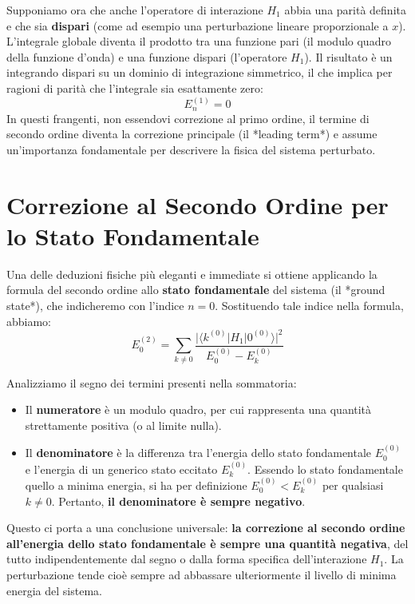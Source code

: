 Supponiamo ora che anche l'operatore di interazione $H_1$ abbia una parità definita e che sia \textbf{dispari} (come ad esempio una perturbazione lineare proporzionale a $x$). L'integrale globale diventa il prodotto tra una funzione pari (il modulo quadro della funzione d'onda) e una funzione dispari (l'operatore $H_1$). Il risultato è un integrando dispari su un dominio di integrazione simmetrico, il che implica per ragioni di parità che l'integrale sia esattamente zero:
\begin{equation}
E_n^{(1)} = 0
\end{equation}
In questi frangenti, non essendovi correzione al primo ordine, il termine di secondo ordine diventa la correzione principale (il *leading term*) e assume un'importanza fondamentale per descrivere la fisica del sistema perturbato.

\section{Correzione al Secondo Ordine per lo Stato Fondamentale}

Una delle deduzioni fisiche più eleganti e immediate si ottiene applicando la formula del secondo ordine allo \textbf{stato fondamentale} del sistema (il *ground state*), che indicheremo con l'indice $n=0$. Sostituendo tale indice nella formula, abbiamo:
\begin{equation}
E_0^{(2)} = \sum_{k \neq 0} \frac{\big| \langle k^{(0)} | H_1 | 0^{(0)} \rangle \big|^2}{E_0^{(0)} - E_k^{(0)}}
\end{equation}

Analizziamo il segno dei termini presenti nella sommatoria:
\begin{itemize}
\item Il \textbf{numeratore} è un modulo quadro, per cui rappresenta una quantità strettamente positiva (o al limite nulla).
\item Il \textbf{denominatore} è la differenza tra l'energia dello stato fondamentale $E_0^{(0)}$ e l'energia di un generico stato eccitato $E_k^{(0)}$. Essendo lo stato fondamentale quello a minima energia, si ha per definizione $E_0^{(0)} < E_k^{(0)}$ per qualsiasi $k \neq 0$. Pertanto, \textbf{il denominatore è sempre negativo}.
\end{itemize}

Questo ci porta a una conclusione universale: \textbf{la correzione al secondo ordine all'energia dello stato fondamentale è sempre una quantità negativa}, del tutto indipendentemente dal segno o dalla forma specifica dell'interazione $H_1$. La perturbazione tende cioè sempre ad abbassare ulteriormente il livello di minima energia del sistema.

